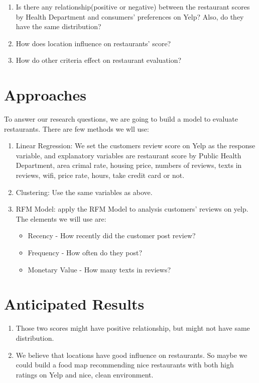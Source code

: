 \documentclass{article}
\begin{document}
\begin{enumerate}
  \item Is there any relationship(positive or negative) between the restaurant scores by Health Department and consumers' preferences on Yelp? Also, do they have  the same distribution?
  \item How does location influence on restaurants' score?
  \item How do other criteria effect on restaurant evaluation? 
\end{enumerate}

\section{Approaches}
To answer our research questions, we are going to build a model to evaluate restaurants. There are few methods we wll use:
\begin{enumerate}
\item Linear Regression: We set the customers review score on Yelp as the response variable, and explanatory variables are restaurant score by Public Health Department, area crimal rate, housing price, numbers of reviews, texts in reviews, wifi, price rate, hours, take credit card or not.
\item Clustering: Use the same variables as above. 
\item RFM Model: apply the RFM Model to analysis customers' reviews on yelp. The elements we will use are: 
\begin{itemize}
\item Recency - How recently did the customer post review?
\item Frequency - How often do they post?
\item Monetary Value - How many texts in reviews?
\end{itemize}
\end{enumerate}

\section{Anticipated Results}
\begin{enumerate}
  \item Those two scores might have positive relationship, but might not have same distribution.
  \item We believe that locations have good influence on restaurants. So maybe we could build a food map recommending nice restaurants with both high ratings on Yelp and nice, clean environment. 
 
\end{enumerate}
\end{document}
